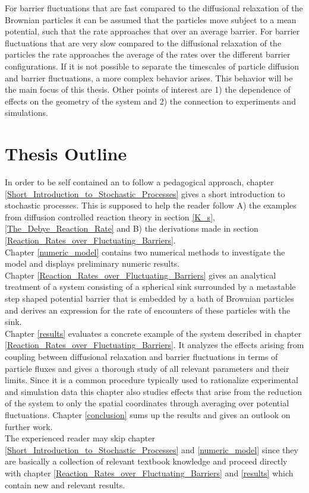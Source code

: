 For barrier fluctuations that are fast compared to the diffusional relaxation of the Brownian particles it can be assumed that the particles move subject to a mean potential, such that the rate approaches that over an average barrier. For barrier fluctuations that are very slow compared to the diffusional relaxation of the particles the rate approaches the average of the rates over the different barrier configurations.
If it is not possible to separate the timescales of particle diffusion and barrier fluctuations, a more complex behavior arises. This behavior will be the main focus of this thesis. 
Other points of interest are 1) the dependence of effects on the geometry of the system and 2) the connection to experiments and simulations.

\section{Thesis Outline}
In order to be self contained an to follow a pedagogical approach, chapter \ref{Short_Introduction_to_Stochastic_Processes} gives a short introduction to stochastic processes. This is supposed to help the reader follow A) the examples from diffusion controlled reaction theory in section \ref{K_s}, \ref{The_Debye_Reaction_Rate} and B) the derivations made in section \ref{Reaction_Rates_over_Fluctuating_Barriers}. \\
Chapter \ref{numeric_model} contains two numerical methods to investigate the model and displays preliminary numeric results. \\
Chapter \ref{Reaction_Rates_over_Fluctuating_Barriers} gives an analytical treatment of a system consisting of a spherical sink surrounded by a metastable step shaped potential barrier that is embedded by a bath of Brownian particles and derives an expression for the rate of encounters of these particles with the sink. \\
Chapter \ref{results} evaluates a concrete example of the system described in chapter \ref{Reaction_Rates_over_Fluctuating_Barriers}. It analyzes the effects arising from coupling between diffusional relaxation and barrier fluctuations in terms of particle fluxes and gives a thorough study of all relevant parameters and their limits. Since it is a common procedure typically used to rationalize experimental and simulation data this chapter also studies effects that arise from the reduction of the system to only the spatial coordinates through averaging over potential fluctuations. Chapter \ref{conclusion} sums up the results and gives an outlook on further work. \\

The experienced reader may skip chapter \ref{Short_Introduction_to_Stochastic_Processes} and \ref{numeric_model} since they are basically a collection of relevant textbook knowledge and proceed directly with chapter \ref{Reaction_Rates_over_Fluctuating_Barriers} and \ref{results} which contain new and relevant results. 
